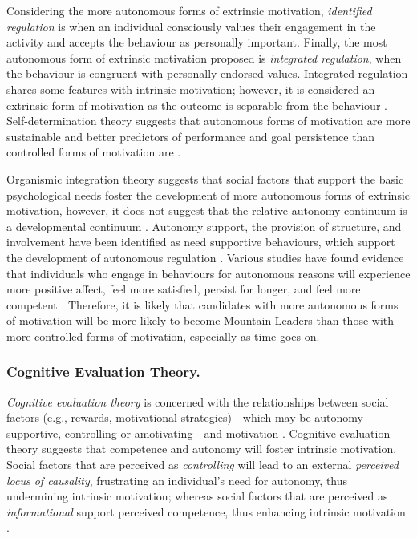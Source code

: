 \documentclass[
  12pt,
  a4paper,
]{book}
\begin{document}
Considering the more autonomous forms of extrinsic motivation, \emph{identified regulation} is when an individual consciously values their engagement in the activity and accepts the behaviour as personally important. Finally, the most autonomous form of extrinsic motivation proposed is \emph{integrated regulation}, when the behaviour is congruent with personally endorsed values. Integrated regulation shares some features with intrinsic motivation; however, it is considered an extrinsic form of motivation as the outcome is separable from the behaviour \citep{Ryan2002}. Self-determination theory suggests that autonomous forms of motivation are more sustainable and better predictors of performance and goal persistence than controlled forms of motivation are \citep{Hagger2015, Pelletier2001, Ryan2019}.

Organismic integration theory suggests that social factors that support the basic psychological needs foster the development of more autonomous forms of extrinsic motivation, however, it does not suggest that the relative autonomy continuum is a developmental continuum \citep{Deci1991, Ryan1995, Ryan2002}. Autonomy support, the provision of structure, and involvement have been identified as need supportive behaviours, which support the development of autonomous regulation \citep{Ryan2016, Markland2010}. Various studies have found evidence that individuals who engage in behaviours for autonomous reasons will experience more positive affect, feel more satisfied, persist for longer, and feel more competent \citep[cf.~][]{Frederick-Recascino2002}. Therefore, it is likely that candidates with more autonomous forms of motivation will be more likely to become Mountain Leaders than those with more controlled forms of motivation, especially as time goes on.

\hypertarget{cognitive-evaluation-theory.}{%
\subsubsection{Cognitive Evaluation Theory.}\label{cognitive-evaluation-theory.}}

\emph{Cognitive evaluation theory} is concerned with the relationships between social factors (e.g., rewards, motivational strategies)---which may be autonomy supportive, controlling or amotivating---and motivation \citep{Deci1975, Deci1980}. Cognitive evaluation theory suggests that competence and autonomy will foster intrinsic motivation. Social factors that are perceived as \emph{controlling} will lead to an external \emph{perceived locus of causality}, frustrating an individual's need for autonomy, thus undermining intrinsic motivation; whereas social factors that are perceived as \emph{informational} support perceived competence, thus enhancing intrinsic motivation \citep{Ryan2019}.
\end{document}
